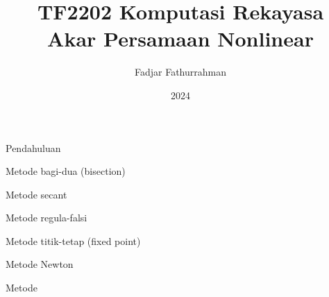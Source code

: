 

\title{TF2202 Komputasi Rekayasa\\
Akar Persamaan Nonlinear}
\author{Fadjar Fathurrahman}
\date{2024}



\frame{\titlepage}

\begin{frame}{Pendahuluan}

Metode bagi-dua (bisection)

Metode secant

Metode regula-falsi

Metode titik-tetap (fixed point)

Metode Newton

Metode 


\end{frame}






